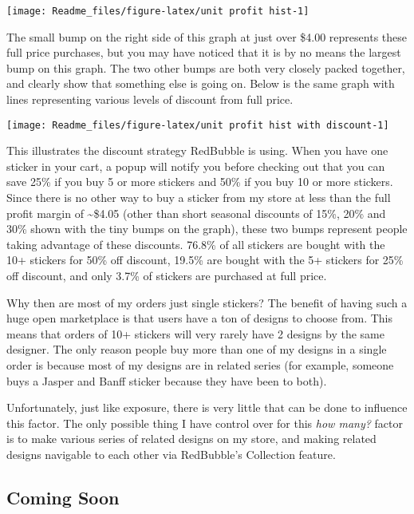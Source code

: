 \documentclass[]{article}
\begin{document}
\begin{center}\texttt{[image: Readme\_files/figure-latex/unit profit hist-1]} \end{center}

The small bump on the right side of this graph at just over \$4.00
represents these full price purchases, but you may have noticed that it
is by no means the largest bump on this graph. The two other bumps are
both very closely packed together, and clearly show that something else
is going on. Below is the same graph with lines representing various
levels of discount from full price.

\begin{center}\texttt{[image: Readme\_files/figure-latex/unit profit hist with discount-1]} \end{center}

This illustrates the discount strategy RedBubble is using. When you have
one sticker in your cart, a popup will notify you before checking out
that you can save 25\% if you buy 5 or more stickers and 50\% if you buy
10 or more stickers. Since there is no other way to buy a sticker from
my store at less than the full profit margin of \textasciitilde{}\$4.05
(other than short seasonal discounts of 15\%, 20\% and 30\% shown with
the tiny bumps on the graph), these two bumps represent people taking
advantage of these discounts. 76.8\% of all stickers are bought with the
10+ stickers for 50\% off discount, 19.5\% are bought with the 5+
stickers for 25\% off discount, and only 3.7\% of stickers are purchased
at full price.

Why then are most of my orders just single stickers? The benefit of
having such a huge open marketplace is that users have a ton of designs
to choose from. This means that orders of 10+ stickers will very rarely
have 2 designs by the same designer. The only reason people buy more
than one of my designs in a single order is because most of my designs
are in related series (for example, someone buys a Jasper and Banff
sticker because they have been to both).

Unfortunately, just like exposure, there is very little that can be done
to influence this factor. The only possible thing I have control over
for this \emph{how many?} factor is to make various series of related
designs on my store, and making related designs navigable to each other
via RedBubble's Collection feature.

\subsection{Coming Soon}\label{coming-soon}
\end{document}
